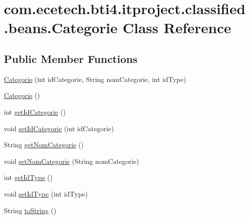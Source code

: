 \hypertarget{classcom_1_1ecetech_1_1bti4_1_1itproject_1_1classified_1_1beans_1_1_categorie}{}\section{com.\+ecetech.\+bti4.\+itproject.\+classified.\+beans.\+Categorie Class Reference}
\label{classcom_1_1ecetech_1_1bti4_1_1itproject_1_1classified_1_1beans_1_1_categorie}
\subsection*{Public Member Functions}
\begin{DoxyCompactItemize}
\item 
\hyperlink{classcom_1_1ecetech_1_1bti4_1_1itproject_1_1classified_1_1beans_1_1_categorie_a151c5e769ad87b8b5cf882e9d5b6b8d6}{Categorie} (int id\+Categorie, String nom\+Categorie, int id\+Type)
\item 
\hyperlink{classcom_1_1ecetech_1_1bti4_1_1itproject_1_1classified_1_1beans_1_1_categorie_a87708c0007fe888f0d546781d8cc1320}{Categorie} ()
\item 
int \hyperlink{classcom_1_1ecetech_1_1bti4_1_1itproject_1_1classified_1_1beans_1_1_categorie_a70d771b7a2c6d24807b4ad8a7599dfb3}{get\+Id\+Categorie} ()
\item 
void \hyperlink{classcom_1_1ecetech_1_1bti4_1_1itproject_1_1classified_1_1beans_1_1_categorie_a7cfebd4ed0c6170eb8eb7e629d667d64}{set\+Id\+Categorie} (int id\+Categorie)
\item 
String \hyperlink{classcom_1_1ecetech_1_1bti4_1_1itproject_1_1classified_1_1beans_1_1_categorie_a5f5d43367d9964e07a45492c036fe49f}{get\+Nom\+Categorie} ()
\item 
void \hyperlink{classcom_1_1ecetech_1_1bti4_1_1itproject_1_1classified_1_1beans_1_1_categorie_aece9e65b0b2001cde88cdc99ad00206b}{set\+Nom\+Categorie} (String nom\+Categorie)
\item 
int \hyperlink{classcom_1_1ecetech_1_1bti4_1_1itproject_1_1classified_1_1beans_1_1_categorie_a75d6febe1021333b087a7e98e764e053}{get\+Id\+Type} ()
\item 
void \hyperlink{classcom_1_1ecetech_1_1bti4_1_1itproject_1_1classified_1_1beans_1_1_categorie_a4a978c04d124319a8fcee08d529352a1}{set\+Id\+Type} (int id\+Type)
\item 
String \hyperlink{classcom_1_1ecetech_1_1bti4_1_1itproject_1_1classified_1_1beans_1_1_categorie_ab5a1c587aa78c348fd1c894754133050}{to\+String} ()
\end{DoxyCompactItemize}



